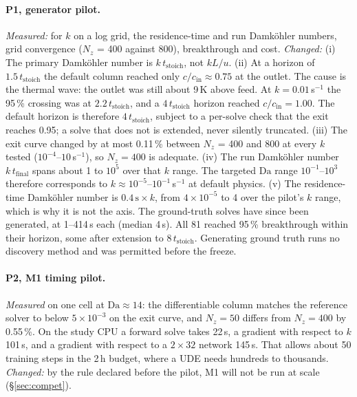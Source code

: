 \documentclass[11pt]{article}
\newcommand{\Da}{\mathrm{Da}}
\begin{document}
\paragraph{P1, generator pilot.}
\emph{Measured:} for $k$ on a log grid, the residence-time and run Damk\"ohler numbers,
grid convergence ($N_z$ = 400 against 800), breakthrough and cost.
\emph{Changed:}
(i) The primary Damk\"ohler number is $k\,t_{\mathrm{stoich}}$, not $kL/u$.
(ii) At a horizon of $1.5\,t_{\mathrm{stoich}}$ the default column reached only
$c/c_{\mathrm{in}} \approx 0.75$ at the outlet. The cause is the thermal wave: the outlet
was still about 9\,K above feed. At $k = 0.01$\,s$^{-1}$ the 95\,\% crossing was at
$2.2\,t_{\mathrm{stoich}}$, and a $4\,t_{\mathrm{stoich}}$ horizon reached
$c/c_{\mathrm{in}} = 1.00$. The default horizon is therefore $4\,t_{\mathrm{stoich}}$,
subject to a per-solve check that the exit reaches 0.95; a solve that does not is
extended, never silently truncated.
(iii) The exit curve changed by at most 0.11\,\% between $N_z$ = 400 and 800 at every $k$
tested ($10^{-4}$--$10$\,s$^{-1}$), so $N_z = 400$ is adequate.
(iv) The run Damk\"ohler number $k\,t_{\mathrm{final}}$ spans about 1 to $10^{5}$ over that
$k$ range. The targeted $\Da$ range $10^{-1}$--$10^{3}$ therefore corresponds to $k
\approx 10^{-5}$--$10^{-1}$\,s$^{-1}$ at default physics.
(v) The residence-time Damk\"ohler number is $0.4\,\mathrm{s}\times k$, from $4\times10^{-5}$
to 4 over the pilot's $k$ range, which is why it is not the axis.
The ground-truth solves have since been generated, at 1--414\,s each (median 4\,s). All 81
reached 95\,\% breakthrough within their horizon, some after extension to
$8\,t_{\mathrm{stoich}}$. Generating ground truth runs no discovery method and was
permitted before the freeze.

\paragraph{P2, M1 timing pilot.}
\emph{Measured} on one cell at $\Da \approx 14$: the differentiable column matches the
reference solver to below $5\times10^{-3}$ on the exit curve, and $N_z = 50$ differs from
$N_z = 400$ by 0.55\,\%. On the study CPU a forward solve takes 22\,s, a gradient with
respect to $k$ 101\,s, and a gradient with respect to a $2\times32$ network 145\,s. That
allows about 50 training steps in the 2\,h budget, where a UDE needs hundreds to thousands.
\emph{Changed:} by the rule declared before the pilot, M1 will not be run at scale
(\S\ref{sec:compet}).
\end{document}
